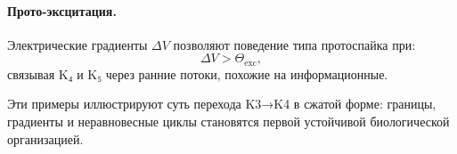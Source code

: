 \paragraph{Прото-эксцитация.}
Электрические градиенты $\Delta V$ позволяют поведение типа протоспайка при:
\[
\Delta V > \Theta_{\mathrm{exc}},
\]
связывая K₄ и K₅ через ранние потоки, похожие на информационные.

Эти примеры иллюстрируют суть перехода K3→K4 в сжатой форме: границы,
градиенты и неравновесные циклы становятся первой устойчивой биологической
организацией.
